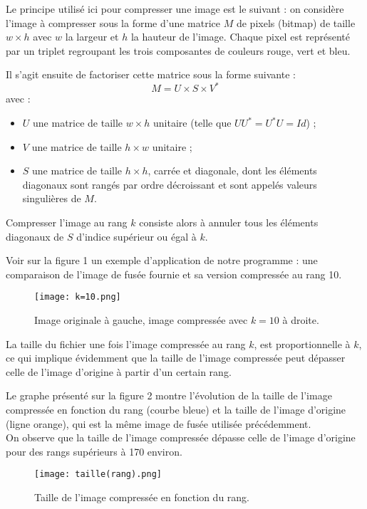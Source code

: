 \documentclass{article}
\begin{document}
Le principe utilisé ici pour compresser une image est le suivant : on considère l'image à compresser sous la forme d'une matrice $M$ de pixels (bitmap) de taille $w \times h$ avec $w$ la largeur et $h$ la hauteur de l'image. Chaque pixel est représenté par un triplet regroupant les trois composantes de couleurs rouge, vert et bleu.\par
Il s'agit ensuite de factoriser cette matrice sous la forme suivante :
$$M = U \times S \times V^*$$
avec :
\begin{itemize}
	\item $U$ une matrice de taille $w \times h$ unitaire (telle que $UU^* = U^*U = Id$) ;
	\item $V$ une matrice de taille $h \times w$ unitaire ;
	\item $S$ une matrice de taille $h \times h$, carrée et diagonale, dont les éléments diagonaux sont rangés par ordre décroissant et sont appelés valeurs singulières de $M$.
\end{itemize}\par

\vspace{5mm}

Compresser l'image au rang $k$ consiste alors à annuler tous les éléments diagonaux de $S$ d'indice supérieur ou égal à $k$.\par

Voir sur la figure 1 un exemple d'application de notre programme : une comparaison de l'image de fusée fournie et sa version compressée au rang 10.\par
\begin{figure}[h]
	\caption{Image originale à gauche, image compressée avec $k=10$ à droite.}
	\texttt{[image: k=10.png]}
\end{figure}

\vspace{5mm}

La taille du fichier une fois l'image compressée au rang $k$, est proportionnelle à $k$, ce qui implique évidemment que la taille de l'image compressée peut dépasser celle de l'image d'origine à partir d'un certain rang.\par
Le graphe présenté sur la figure 2 montre l'évolution de la taille de l'image compressée en fonction du rang (courbe bleue) et la taille de l'image d'origine (ligne orange), qui est la même image de fusée utilisée précédemment.\\
On observe que la taille de l'image compressée dépasse celle de l'image d'origine pour des rangs supérieurs à 170 environ.\par
\begin{figure}[h]
	\caption{Taille de l'image compressée en fonction du rang.}
	\texttt{[image: taille(rang).png]}
\end{figure}
\end{document}
